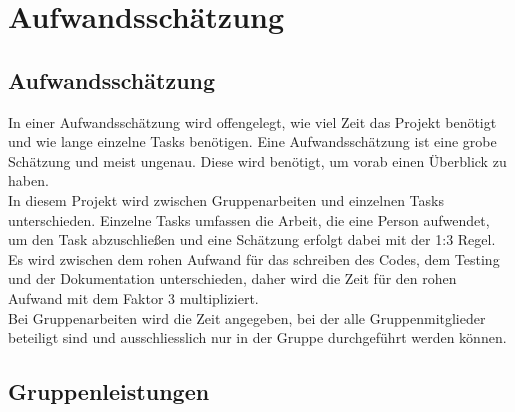 \chapter{Aufwandsschätzung}\label{ch:aufwandsschatzung}
\newcommand{\trschaetzung}[3]{\rowcolor{lightgray}\textbf{#1} & \textbf{#2} \\* \multicolumn{2}{|l|}{\begin{tabular}[c]{@{}l@{}}#3\end{tabular}} \\ \hline}

\section{Aufwandsschätzung}\label{sec:aufwandsschatzung}

In einer Aufwandsschätzung wird offengelegt, wie viel Zeit das Projekt benötigt und wie lange einzelne Tasks benötigen.
Eine Aufwandsschätzung ist eine grobe Schätzung und meist ungenau. Diese wird benötigt, um vorab einen Überblick zu haben.\\
In diesem Projekt wird zwischen Gruppenarbeiten und einzelnen Tasks unterschieden. Einzelne Tasks umfassen die Arbeit, die eine Person aufwendet, um den Task abzuschließen und eine Schätzung erfolgt dabei mit der 1:3 Regel. Es wird zwischen dem rohen Aufwand für das schreiben des Codes, dem Testing und der Dokumentation unterschieden, daher wird die Zeit für den rohen Aufwand mit dem Faktor 3 multipliziert.\\
Bei Gruppenarbeiten wird die Zeit angegeben, bei der alle Gruppenmitglieder beteiligt sind und ausschliesslich nur in der Gruppe durchgeführt werden können. 

\section{Gruppenleistungen}\label{sec:gruppenleistungen}


